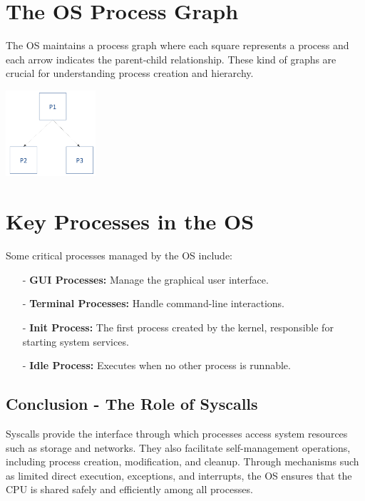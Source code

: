 \documentclass[../../compsys.tex]{subfiles}
\begin{document}
\section{The OS Process Graph}
The OS maintains a process graph where each square represents a process and each arrow indicates the parent-child relationship. These kind of graphs are crucial for understanding process creation and hierarchy.

\begin{center}
  \includegraphics[width=0.25\textwidth]{chapters/L3/images/graph.png}
\end{center}

\section{Key Processes in the OS}

Some critical processes managed by the OS include:
\begin{itemize}
  \item[-] \textbf{GUI Processes:} Manage the graphical user interface.
  \item[-] \textbf{Terminal Processes:} Handle command-line interactions.
  \item[-] \textbf{Init Process:} The first process created by the kernel, responsible for starting system services.
  \item[-] \textbf{Idle Process:} Executes when no other process is runnable.
\end{itemize}

\subsection*{Conclusion - The Role of Syscalls}

Syscalls provide the interface through which processes access system resources such as storage and networks. They also facilitate self-management operations, including process creation, modification, and cleanup. Through mechanisms such as limited direct execution, exceptions, and interrupts, the OS ensures that the CPU is shared safely and efficiently among all processes.
\end{document}
